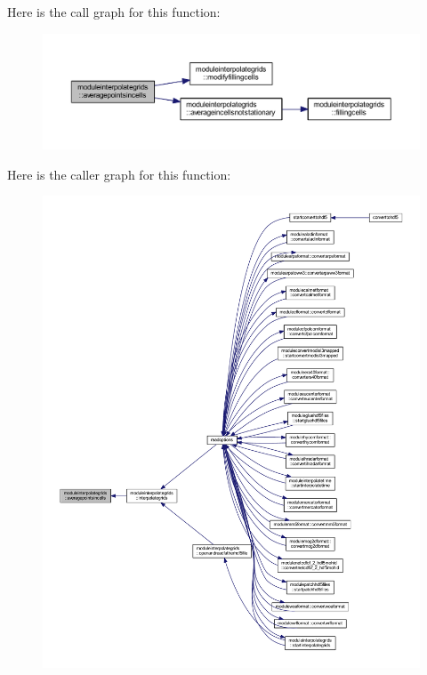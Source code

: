 Here is the call graph for this function\+:\nopagebreak
\begin{figure}[H]
\begin{center}
\leavevmode
\includegraphics[width=350pt]{namespacemoduleinterpolategrids_a88091593ce71c7617aca77912135e4af_cgraph}
\end{center}
\end{figure}
Here is the caller graph for this function\+:\nopagebreak
\begin{figure}[H]
\begin{center}
\leavevmode
\includegraphics[width=350pt]{namespacemoduleinterpolategrids_a88091593ce71c7617aca77912135e4af_icgraph}
\end{center}
\end{figure}
\mbox{\label{namespacemoduleinterpolategrids_aa9562e1a85edb00f05d06ebe2ec3f113}} 
